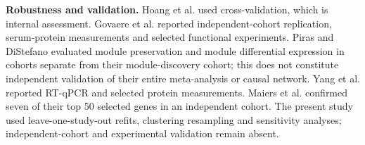 \textbf{Robustness and validation.} Hoang et al. used cross-validation, which is internal assessment. Govaere et al. reported independent-cohort replication, serum-protein measurements and selected functional experiments. Piras and DiStefano evaluated module preservation and module differential expression in cohorts separate from their module-discovery cohort; this does not constitute independent validation of their entire meta-analysis or causal network. Yang et al. reported RT-qPCR and selected protein measurements. Maiers et al. confirmed seven of their top 50 selected genes in an independent cohort. The present study used leave-one-study-out refits, clustering resampling and sensitivity analyses; independent-cohort and experimental validation remain absent.
\endgroup


